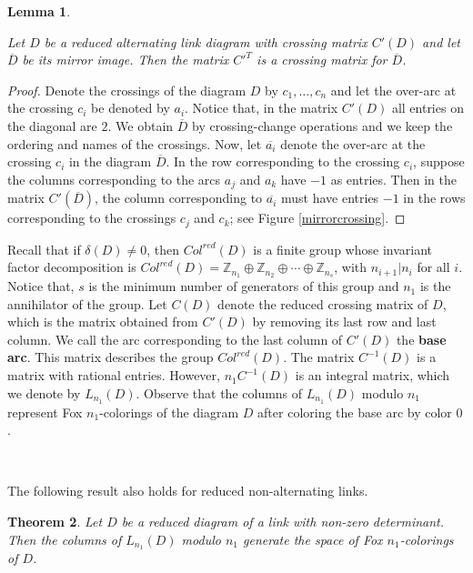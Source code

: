 \documentclass[11pt]{amsart}
\newtheorem{theorem}{Theorem}[section]
\newtheorem{lemma}[theorem]{Lemma}
\begin{document}
\begin{lemma}\label{Mirror}

Let $D$ be a reduced alternating link diagram with crossing matrix $C'(D)$ and let $\overline{D}$ be its mirror image. Then the matrix $C'^{T}$ is a crossing matrix for $\overline{D}$.

\end{lemma}

\begin{proof}

Denote the crossings of the diagram $D$ by $c_1, \dots,c_n$ and let the over-arc at the crossing $c_i$ be denoted by $a_i$. Notice that, in the matrix $C'(D)$ all entries on the diagonal are $2$. We obtain $\overline{D}$ by crossing-change operations and we keep the ordering and names of the crossings. Now, let $\overline{a_i}$ denote the  over-arc at the crossing $c_i$ in the diagram $\overline{D}$. In the row corresponding to the crossing $c_i$, suppose the columns corresponding to the arcs $a_j$ and $a_k$ have $-1$ as entries. Then in the matrix $C'(\overline{D})$, the column corresponding to $\overline{a_i}$ must have entries $-1$ in the rows corresponding to the crossings $c_j$ and $c_k$; see Figure \ref{mirrorcrossing}.

\end{proof}

Recall that if $\delta(D)\neq0$, then  $Col^{red}(D)$ is a finite group whose invariant factor decomposition is $Col^{red}(D) = \mathbb Z_{n_1}\oplus \mathbb Z_{n_2}\oplus \cdots \oplus \mathbb Z_{n_s}$, with $n_{i+1} | n_i$ for all $i$. Notice that, $s$ is the minimum number of generators of this group and $n_{1}$ is the annihilator of the group. Let $C(D)$ denote the reduced crossing matrix of $D$, which is the matrix obtained from $C'(D)$ by removing its last row and last column. We call the arc corresponding to the last column of $C'(D)$ the \textbf{base arc}. This matrix describes the group $Col^{red}(D)$. The matrix $C^{-1}(D)$ is a matrix with rational entries. However, $n_1C^{-1}(D)$ is an integral matrix, which we denote by $L_{n_1}(D).$ Observe that the columns of $L_{n_1}(D)$ modulo $n_1$ represent Fox $n_1$-colorings of the diagram $D$ after coloring the base arc by color $0$.

\

The following result also holds for reduced non-alternating links.

\begin{theorem}\label{generatorlemma}
        Let $D$ be a reduced  diagram of a link with non-zero determinant. Then the columns of $L_{n_1}(D)$  modulo $n_1$  generate the space of Fox $n_1$-colorings of $D$.
        
\end{theorem}
\end{document}

